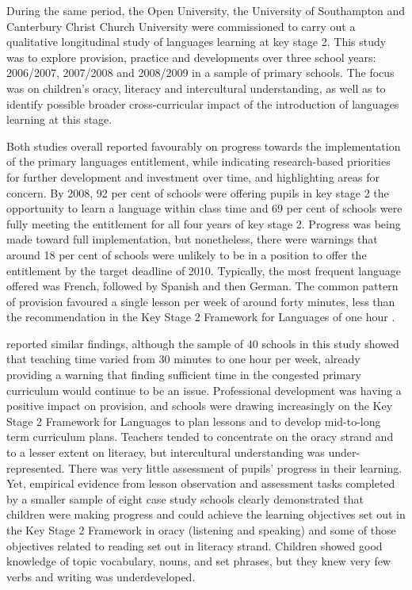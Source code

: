 \documentclass[output=paper]{langscibook}
\begin{document}
During the same period, the Open University, the University of Southampton and Canterbury Christ Church University were commissioned to carry out a qualitative longitudinal study of languages learning at key stage 2. This study was to explore provision, practice and developments over three school years: 2006/2007, 2007/2008 and 2008/2009 in a sample of primary schools. The focus was on children’s oracy, literacy and intercultural understanding, as well as to identify possible broader cross-curricular impact of the introduction of languages learning at this stage. 

Both studies overall reported favourably on progress towards the implementation of the primary languages entitlement, while indicating research-based priorities for further development and investment over time, and highlighting areas for concern. By 2008, 92 per cent of schools were offering pupils in key stage 2 the opportunity to learn a language within class time and 69 per cent of schools were fully meeting the entitlement for all four years of key stage 2. Progress was being made toward full implementation, but nonetheless, there were warnings that around 18 per cent of schools were unlikely to be in a position to offer the entitlement by the target deadline of 2010. Typically, the most frequent language offered was French, followed by Spanish and then German. The common pattern of provision favoured a single lesson per week of around forty minutes, less than the recommendation in the Key Stage 2 Framework for Languages of one hour \citep{WadeEtAl2009}.

\citet{CableEtAl2010} reported similar findings, although the sample of 40 schools in this study showed that teaching time varied from 30 minutes to one hour per week, already providing a warning that finding sufficient time in the congested primary curriculum would continue to be an issue. Professional development was having a positive impact on provision, and schools were drawing increasingly on the Key Stage 2 Framework for Languages to plan lessons and to develop mid-to-long term curriculum plans. Teachers tended to concentrate on the oracy strand and to a lesser extent on literacy, but intercultural understanding was under-represented. There was very little assessment of pupils’ progress in their learning. Yet, empirical evidence from lesson observation and assessment tasks completed by a smaller sample of eight case study schools clearly demonstrated that children were making progress and could achieve the learning objectives set out in the Key Stage 2 Framework in oracy (listening and speaking) and some of those objectives related to reading set out in literacy strand. Children showed good knowledge of topic vocabulary, nouns, and set phrases, but they knew very few verbs and writing was underdeveloped. 
\end{document}
